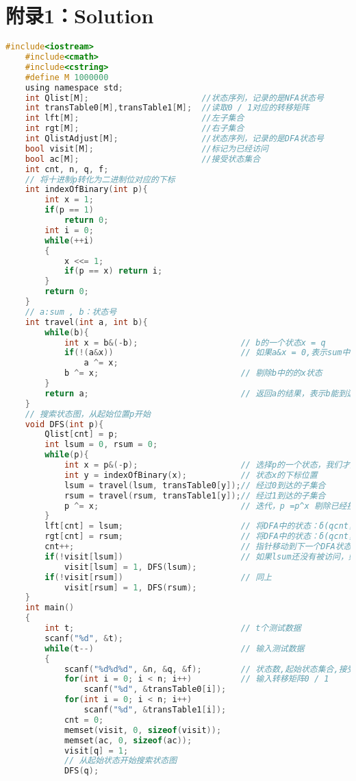 \newpage
\section{附录1：Solution}
\begin{lstlisting}[language=c]
    #include<iostream>
    #include<cmath>
    #include<cstring>
    #define M 1000000
    using namespace std;
    int Qlist[M];                       //状态序列，记录的是NFA状态号     
    int transTable0[M],transTable1[M];  //读取0 / 1对应的转移矩阵
    int lft[M];                         //左子集合
    int rgt[M];                         //右子集合
    int QlistAdjust[M];                 //状态序列，记录的是DFA状态号
    bool visit[M];                      //标记为已经访问
    bool ac[M];                         //接受状态集合
    int cnt, n, q, f;
    // 将十进制p转化为二进制位对应的下标
    int indexOfBinary(int p){
        int x = 1;
        if(p == 1)
            return 0;
        int i = 0;
        while(++i)
        {
            x <<= 1;
            if(p == x) return i;
        }
        return 0;
    }
    // a:sum , b：状态号
    int travel(int a, int b){
        while(b){
            int x = b&(-b);                     // b的一个状态x = q
            if(!(a&x))                          // 如果a&x = 0,表示sum中不含x状态，用 ^ 添加
                a ^= x;             
            b ^= x;                             // 剔除b中的的x状态
        }
        return a;                               // 返回a的结果，表示b能到达的子集合
    }
    // 搜索状态图，从起始位置p开始
    void DFS(int p){
        Qlist[cnt] = p;
        int lsum = 0, rsum = 0;
        while(p){
            int x = p&(-p);                     // 选择p的一个状态，我们才用与上p的补运算可以取出最后一个为1的位
            int y = indexOfBinary(x);           // 状态x的下标位置
            lsum = travel(lsum, transTable0[y]);// 经过0到达的子集合
            rsum = travel(rsum, transTable1[y]);// 经过1到达的子集合
            p ^= x;                             // 迭代，p =p^x 剔除已经搜索的状态x，也就是最后一位
        }
        lft[cnt] = lsum;                        // 将DFA中的状态：δ(qcnt，0)保存
        rgt[cnt] = rsum;                        // 将DFA中的状态：δ(qcnt，1)保存
        cnt++;                                  // 指针移动到下一个DFA状态
        if(!visit[lsum])                        // 如果lsum还没有被访问，则要迭代访问lsum
            visit[lsum] = 1, DFS(lsum);
        if(!visit[rsum])                        // 同上
            visit[rsum] = 1, DFS(rsum);           
    }
    int main()
    {
        int t;                                  // t个测试数据
        scanf("%d", &t);                        
        while(t--)                              // 输入测试数据
        {
            scanf("%d%d%d", &n, &q, &f);        // 状态数,起始状态集合,接受状态集合的特征串对应的整数
            for(int i = 0; i < n; i++)          // 输入转移矩阵0 / 1
                scanf("%d", &transTable0[i]);
            for(int i = 0; i < n; i++)
                scanf("%d", &transTable1[i]);
            cnt = 0;
            memset(visit, 0, sizeof(visit));
            memset(ac, 0, sizeof(ac));
            visit[q] = 1;
            // 从起始状态开始搜索状态图
            DFS(q);
    

\end{lstlisting}
